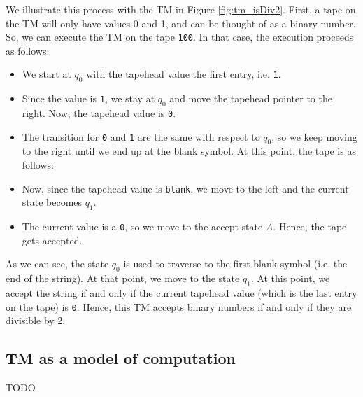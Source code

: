 We illustrate this process with the TM in Figure \ref{fig:tm_isDiv2}. First, a tape on the TM will only have values 0 and 1, and can be thought of as a binary number. So, we can execute the TM on the tape \texttt{100}. In that case, the execution proceeds as follows:
\begin{itemize}
    \item We start at $q_0$ with the tapehead value the first entry, i.e. \texttt{1}.
    \item Since the value is \texttt{1}, we stay at $q_0$ and move the tapehead pointer to the right. Now, the tapehead value is \texttt{0}.
    \item The transition for \texttt{0} and \texttt{1} are the same with respect to $q_0$, so we keep moving to the right until we end up at the blank symbol. At this point, the tape is as follows:
    \begin{figure}[H]
        \centering
    \end{figure}
    \item Now, since the tapehead value is \texttt{blank}, we move to the left and the current state becomes $q_1$.
    \item The current value is a \texttt{0}, so we move to the accept state $A$. Hence, the tape gets accepted.
\end{itemize}
As we can see, the state $q_0$ is used to traverse to the first blank symbol (i.e. the end of the string). At that point, we move to the state $q_1$. At this point, we accept the string if and only if the current tapehead value (which is the last entry on the tape) is \texttt{0}. Hence, this TM accepts binary numbers if and only if they are divisible by 2.

\subsection{TM as a model of computation}
TODO



